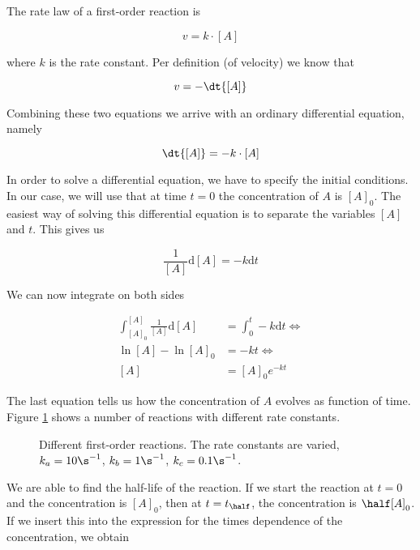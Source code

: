 The rate law of a first-order reaction is

\begin{equation}
  \label{eq:firstOrderVelocity1}
  v = k\cdot [A]
\end{equation}

where $k$ is the rate constant. Per definition (of velocity) we know that

\begin{equation}
  \label{eq:firstOrderVelocity2}
  v = - \dt{[A]}
\end{equation}

Combining these two equations we arrive with an ordinary differential equation, namely

\begin{equation}
  \label{eq:firstOrder}
  \dt{[A]} = -k\cdot [A]
\end{equation}

In order to solve a differential equation, we have to specify the initial conditions. In our case, we will use that at time $t = 0$ the concentration of $A$ is $[A]_0$. The easiest way of solving this differential equation is to separate the variables \ie $[A]$ and $t$. This gives us

\begin{equation}
  \label{eq:firstOrderSeparation}
  \frac{1}{[A]}\mathrm{d}[A] = -k\mathrm{d}t
\end{equation}

We can now integrate on both sides \ie

\begin{align}
  \int_{[A]_0}^{[A]} \frac{1}{[A]}\mathrm{d}[A] &= \int_0^t -k\mathrm{d}t \Leftrightarrow  \nonumber \\
  \ln[A] - \ln[A]_0 &= -kt \Leftrightarrow \nonumber \\
  [A] &= [A]_0e^{-kt}
\end{align}

The last equation tells us how the concentration of $A$ evolves as function of time. Figure \ref{fig:FirstOrderReactions} shows a number of reactions with different rate constants.

\begin{figure}
  \centering

  \caption{Different first-order reactions. The rate constants are varied, $k_a = 10\s^{-1}$, $k_b = 1\s^{-1}$, $k_c = 0.1\s^{-1}$.}
  \label{fig:FirstOrderReactions}
\end{figure}

We are able to find the half-life of the reaction. If we start the reaction at $t = 0$ and the concentration is $[A]_0$, then at $t = t_\half$, the concentration is $\half [A]_0$. If we insert this into the expression for the times dependence of the concentration, we obtain

